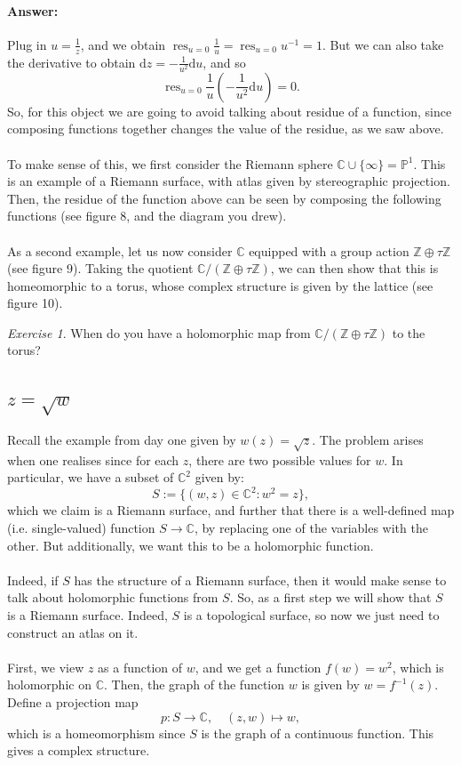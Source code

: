 \documentclass[a4paper]{report}
\theoremstyle{definition}
\theoremstyle{remark}
\theoremstyle{proposition}
\theoremstyle{conjecture}
\theoremstyle{lemma}
\theoremstyle{corollary}
\theoremstyle{exercise}
\newtheorem{exercise}{Exercise}
\theoremstyle{example}
\newcommand{\C}{\mathbb{C}}
\newcommand{\on}{\operatorname}
\begin{document}
\paragraph{Answer:} Plug in $u = \frac{1}{z}$,
and we obtain $\on{res}_{u = 0} \frac{1}{u} = \on{res}_{u=0}u^{-1}= 1$.
But we can also take the derivative to obtain $\mathrm{d}z = -\frac{1}{u^2}\mathrm{d}u$, and so $$\on{res}_{u=0}\frac{1}{u} \left(-\frac{1}{u^2}\mathrm{d}u\right) = 0.$$
So, for this object we are going to avoid talking about residue of a function,
since composing functions together changes the value of the residue, as we
saw above.\\\\
To make sense of this, we first consider the Riemann sphere 
$\C \cup \lbrace\infty\rbrace = \mathbb{P}^1$. This is an example of a 
Riemann surface, with atlas given by stereographic projection. Then, the 
residue of the function above can be seen by composing the following functions 
(see figure 8, and the diagram you drew).\\\\
As a second example, let us now consider $\C$ equipped with a group
action $\mathbb{Z}\oplus \tau\mathbb{Z}$ (see figure 9). 
Taking the quotient $\C/(\mathbb{Z}\oplus \tau\mathbb{Z})$, we can then 
show that this is homeomorphic to a torus, whose complex structure is given 
by the lattice (see figure 10).

\begin{exercise}
    When do you have a holomorphic map from 
    $\C/(\mathbb{Z}\oplus \tau\mathbb{Z})$
    to the torus?
\end{exercise}

\subsection{$z = \sqrt{w}$}

Recall the example from day one given by $w(z) = \sqrt{z}$. The problem 
arises when one realises since for each $z$, there are two possible values for 
$w$. In particular, we have a subset of $\C^2$ given by:
$$S :=\lbrace (w,z) \in \C^2 : w^2 = z\rbrace,$$
which we claim is a Riemann surface, and further that there is 
a well-defined map (i.e. single-valued) function $S \to \C$, by replacing 
one of the variables with the other. But additionally,
we want this to be a holomorphic function.\\\\
Indeed, if $S$ has the structure of a Riemann surface, then it would make sense 
to talk about holomorphic functions from $S$. So, as a first step we will 
show that $S$ is a Riemann surface. Indeed, $S$ is a topological surface, 
so now we just need to construct an atlas on it.\\\\
First, we view $z$ as a function of $w$, and we get a function $f(w) = w^2$, 
which is holomorphic on $\C$. Then, the graph of the function $w$
is given by $w = f^{-1}(z)$.
Define a projection map $$p : S \to \C, \quad (z,w) \longmapsto w,$$
which is a homeomorphism since $S$ is the graph of a continuous function.
This gives a complex structure.
\end{document}
